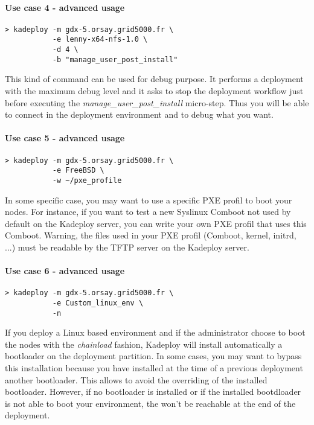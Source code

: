 \documentclass[a4wide,10pt,oneside]{book}
\begin{document}
\paragraph{Use case 4 - advanced usage}
\begin{verbatim}
> kadeploy -m gdx-5.orsay.grid5000.fr \
           -e lenny-x64-nfs-1.0 \
           -d 4 \
           -b "manage_user_post_install"
\end{verbatim}
This kind of command can be used for debug purpose. It performs a deployment with the maximum debug level and it asks to stop the deployment workflow just before executing the \textit{manage\_user\_post\_install} micro-step. Thus you will be able to connect in the deployment environment and to debug what you want.

\paragraph{Use case 5 - advanced usage}
\begin{verbatim}
> kadeploy -m gdx-5.orsay.grid5000.fr \
           -e FreeBSD \
           -w ~/pxe_profile
\end{verbatim}
In some specific case, you may want to use a specific PXE profil to boot your nodes. For instance, if you want to test a new Syslinux Comboot not used by default on the Kadeploy server, you can write your own PXE profil that uses this Comboot. Warning, the files used in your PXE profil (Comboot, kernel, initrd, ...) must be readable by the TFTP server on the Kadeploy server.

\paragraph{Use case 6 - advanced usage}
\begin{verbatim}
> kadeploy -m gdx-5.orsay.grid5000.fr \
           -e Custom_linux_env \
           -n
\end{verbatim}
If you deploy a Linux based environment and if the administrator choose to boot the nodes with the \textit{chainload} fashion, Kadeploy will install automatically a bootloader on the deployment partition. In some cases, you may want to bypass this installation because you have installed at the time of a previous deployment another bootloader. This allows to avoid the overriding of the installed bootloader. However, if no bootloader is installed or if the installed bootdloader is not able to boot your environment, the won't be reachable at the end of the deployment.
\end{document}
